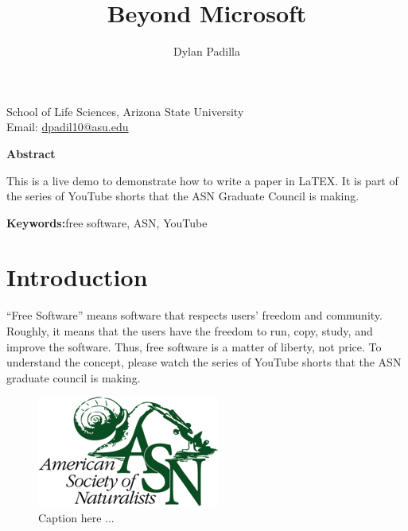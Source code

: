 \documentclass[12pt]{article}
\title{\renewcommand{\baselinestretch}{1.17}\large\bf Beyond Microsoft}
\author{\normalsize Dylan Padilla}
\begin{document}
\date{}

\maketitle

\noindent
School of Life Sciences, Arizona State University \\
Email: \url{dpadil10@asu.edu} \vspace{6px}



\noindent
{\normalsize{\bf Abstract}
\newline

This is a live demo to demonstrate how to write a paper in LaTEX. It is part of the series of YouTube shorts that the ASN Graduate Council is making.
}

\noindent
{\small{\bf Keywords:}{free software, ASN, YouTube}
}


\newpage
\noindent
\section*{\normalsize Introduction}
``Free Software'' means software that respects users' freedom and community. Roughly, it means that the users have the freedom to run, copy, study, and improve the software. Thus, free software is a matter of liberty, not price. To understand the concept, please watch the series of YouTube shorts that the ASN graduate council is making.


\vspace{30pt}

\begin{figure}[!htb]
\centering
\includegraphics[scale=0.5]{imgs/ASN_logo.png}
\caption{Caption here ...}
\label{fig:1}
\end{figure}
\end{document}
